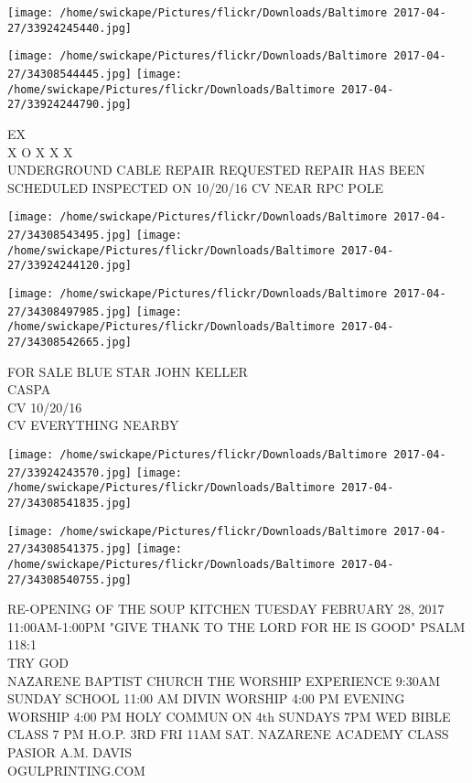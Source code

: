 \documentclass[10pt,letterpaper]{article}
\begin{document}
\texttt{[image: /home/swickape/Pictures/flickr/Downloads/Baltimore 2017-04-27/33924245440.jpg]}

\vspace{0.25in}
\texttt{[image: /home/swickape/Pictures/flickr/Downloads/Baltimore 2017-04-27/34308544445.jpg]}
\texttt{[image: /home/swickape/Pictures/flickr/Downloads/Baltimore 2017-04-27/33924244790.jpg]}

EX\\
X O X X X\\
UNDERGROUND CABLE REPAIR REQUESTED REPAIR HAS BEEN SCHEDULED INSPECTED ON 10/20/16 CV NEAR RPC POLE\\
\pagebreak

\texttt{[image: /home/swickape/Pictures/flickr/Downloads/Baltimore 2017-04-27/34308543495.jpg]}
\texttt{[image: /home/swickape/Pictures/flickr/Downloads/Baltimore 2017-04-27/33924244120.jpg]}

\texttt{[image: /home/swickape/Pictures/flickr/Downloads/Baltimore 2017-04-27/34308497985.jpg]}
\texttt{[image: /home/swickape/Pictures/flickr/Downloads/Baltimore 2017-04-27/34308542665.jpg]}

FOR SALE BLUE STAR JOHN KELLER\\
CASPA\\
CV 10/20/16\\
CV EVERYTHING NEARBY\\
\pagebreak

\texttt{[image: /home/swickape/Pictures/flickr/Downloads/Baltimore 2017-04-27/33924243570.jpg]}
\texttt{[image: /home/swickape/Pictures/flickr/Downloads/Baltimore 2017-04-27/34308541835.jpg]}

\texttt{[image: /home/swickape/Pictures/flickr/Downloads/Baltimore 2017-04-27/34308541375.jpg]}
\texttt{[image: /home/swickape/Pictures/flickr/Downloads/Baltimore 2017-04-27/34308540755.jpg]}

RE{-}OPENING OF THE SOUP KITCHEN TUESDAY FEBRUARY 28, 2017 11:00AM{-}1:00PM "GIVE THANK TO THE LORD FOR HE IS GOOD" PSALM 118:1\\
TRY GOD\\
NAZARENE BAPTIST CHURCH THE WORSHIP EXPERIENCE 9:30AM SUNDAY SCHOOL 11:00 AM DIVIN WORSHIP 4:00 PM EVENING WORSHIP 4:00 PM HOLY COMMUN ON 4th SUNDAYS 7PM WED BIBLE CLASS 7 PM H.O.P. 3RD FRI 11AM SAT. NAZARENE ACADEMY CLASS PASIOR A.M. DAVIS\\
OGULPRINTING.COM\\
\pagebreak
\end{document}
